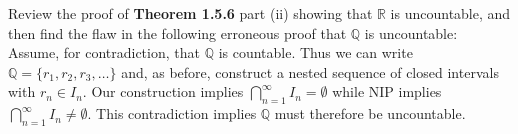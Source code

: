 \documentclass[12pt]{article}
\newcommand{\R}{\mathbb{R}}
\newcommand{\Q}{\mathbb{Q}}
\newenvironment{problem}[2][Problem]{\begin{trivlist}
		\item[\hskip \labelsep {\bfseries #1}\hskip \labelsep {\bfseries #2.}]}{\end{trivlist}}
\begin{document}
	\begin{problem}{1.5.2}
		Review the proof of \textbf{Theorem 1.5.6} part (ii) showing that $\R$ is uncountable, and then find the flaw in the following erroneous proof that $\Q$ is uncountable:\\
		Assume, for contradiction, that $\Q$ is countable. Thus we can write $\Q = \{r_{1},r_{2},r_{3},\ldots\}$ and, as before, construct a nested sequence of closed intervals with $r_{n} \in I_{n}$. Our construction implies $\bigcap_{n=1}^{\infty} I_{n} = \emptyset$ while NIP implies $\bigcap_{n=1}^{\infty} I_{n} \neq \emptyset$. This contradiction implies $\Q$ must therefore be uncountable.  
	\end{problem}
\end{document}
